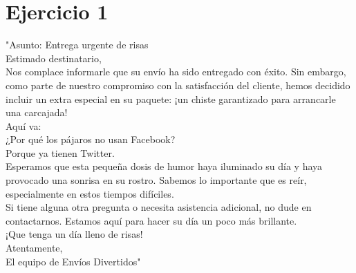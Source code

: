 \section{Ejercicio 1}
"Asunto: Entrega urgente de risas\\

Estimado destinatario,\\

Nos complace informarle que su envío ha sido entregado con éxito. Sin embargo, como parte de nuestro compromiso con la satisfacción del cliente, hemos decidido incluir un extra especial en su paquete: ¡un chiste garantizado para arrancarle una carcajada!\\

Aquí va:\\

¿Por qué los pájaros no usan Facebook?\\

Porque ya tienen Twitter.\\

Esperamos que esta pequeña dosis de humor haya iluminado su día y haya provocado una sonrisa en su rostro. Sabemos lo importante que es reír, especialmente en estos tiempos difíciles.\\

Si tiene alguna otra pregunta o necesita asistencia adicional, no dude en contactarnos. Estamos aquí para hacer su día un poco más brillante.\\

¡Que tenga un día lleno de risas!\\

Atentamente,\\
El equipo de Envíos Divertidos"\\

